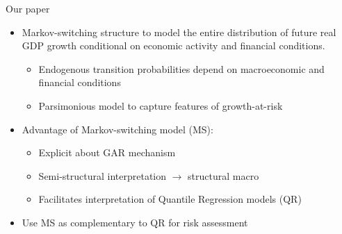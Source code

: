 \documentclass[xcolor=dvipsnames, xcolor=table, 10pt]{beamer}
\newcommand{\rr}[1]{{\color{darkred}#1}}
\begin{document}
\begin{frame}{Our paper}
\vspace*{0.12in}
\begin{itemize}
\item Markov-switching structure to model the \rr{entire} distribution of future real GDP growth \rr{conditional on economic activity and financial conditions}.
\medskip
     \begin{itemize}
     \item Endogenous transition probabilities depend on macroeconomic and financial conditions
\medskip
     \item Parsimonious model to capture features of growth-at-risk
\end{itemize}
\bigskip
\item Advantage of Markov-switching model (MS):
       \medskip
       \begin{itemize}
        \item Explicit about GAR mechanism
        \medskip
        \item Semi-structural interpretation $\rightarrow$ structural macro
        \medskip
         \item Facilitates interpretation of Quantile Regression models (QR)
       \end{itemize}
\medskip
\item Use MS as complementary to QR for risk assessment
\end{itemize}
\end{frame}

\end{document}
